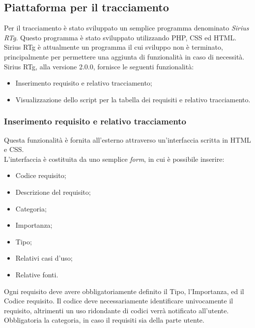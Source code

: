 \subsection{Piattaforma per il tracciamento}
Per il tracciamento è stato sviluppato un semplice programma denominato \textit{Sirius RTg}. Questo programma è stato sviluppato utilizzando PHP, CSS ed HTML. Sirius RTg è attualmente un programma il cui sviluppo non è terminato, principalmente per permettere una aggiunta di funzionalità in caso di necessità. Sirius RTg, alla versione 2.0.0, fornisce le seguenti funzionalità:
\begin{itemize}
\item Inserimento requisito e relativo tracciamento;
\item Visualizzazione dello script per la tabella dei requisiti e relativo tracciamento.
\end{itemize}
\subsubsection{Inserimento requisito e relativo tracciamento}
Questa funzionalità è fornita all'esterno attraverso un'interfaccia scritta in HTML e CSS.\\
L'interfaccia è costituita da uno semplice \textit{form}, in cui è possibile inserire:
\begin{itemize}
\item Codice requisito;
\item Descrizione del requisito;
\item Categoria;
\item Importanza;
\item Tipo;
\item Relativi casi d'uso;
\item Relative fonti.
\end{itemize}
Ogni requisito deve avere obbligatoriamente definito il Tipo, l'Importanza, ed il Codice requisito. Il codice deve necessariamente identificare univocamente il requisito, altrimenti un uso ridondante di codici verrà notificato all'utente. Obbligatoria la categoria, in caso il requisiti sia della parte utente.
